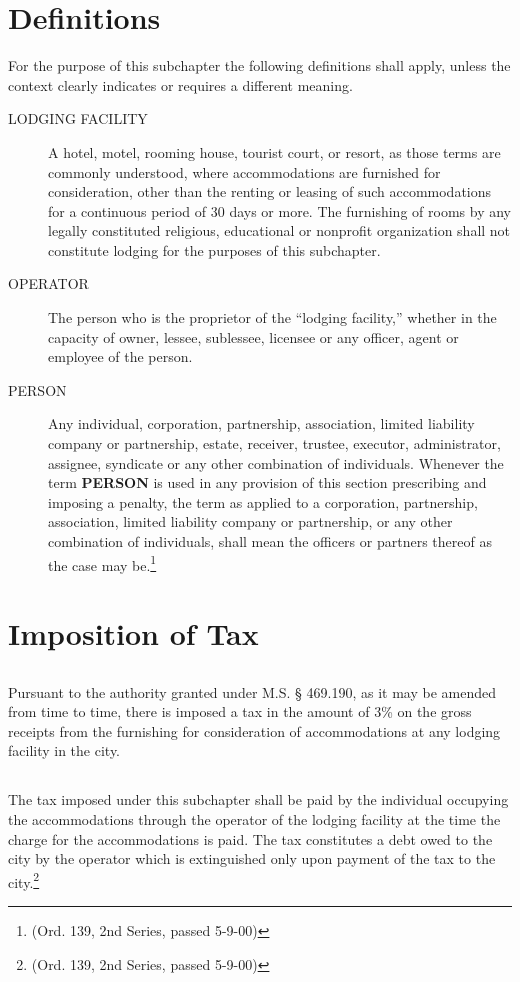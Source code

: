 \section{Definitions}
For the purpose of this subchapter the following definitions shall apply, unless the context clearly indicates or requires a different meaning.
\begin{description}
    \item[LODGING FACILITY] A hotel, motel, rooming house, tourist court, or resort, as those terms are commonly understood, where accommodations are furnished for consideration, other than the renting or leasing of such accommodations for a continuous period of 30 days or more.  The furnishing of rooms by any legally constituted religious, educational or nonprofit organization shall not constitute lodging for the purposes of this subchapter.
    \item[OPERATOR] The person who is the proprietor of the “lodging facility,” whether in the capacity of owner, lessee, sublessee, licensee or any officer, agent or employee of the person.
    \item[PERSON] Any individual, corporation, partnership, association, limited liability company or partnership, estate, receiver, trustee, executor, administrator, assignee, syndicate or any other combination of individuals.  Whenever the term \textbf{PERSON} is used in any provision of this section prescribing and imposing a penalty, the term as applied to a corporation, partnership, association, limited liability company or partnership, or any other combination of individuals, shall mean the officers or partners thereof as the case may be.\footnote{(Ord. 139, 2nd Series, passed 5-9-00)}
\end{description}
\section{Imposition of Tax}
\subsection{}
Pursuant to the authority granted under M.S. § 469.190, as it may be amended from time to time, there is imposed a tax in the amount of 3\% on the gross receipts from the furnishing for consideration of accommodations at any lodging facility in the city.
\subsection{}
The tax imposed under this subchapter shall be paid by the individual occupying the accommodations through the operator of the lodging facility at the time the charge for the accommodations is paid.  The tax constitutes a debt owed to the city by the operator which is extinguished only upon payment of the tax to the city.\footnote{(Ord. 139, 2nd Series, passed 5-9-00)}
